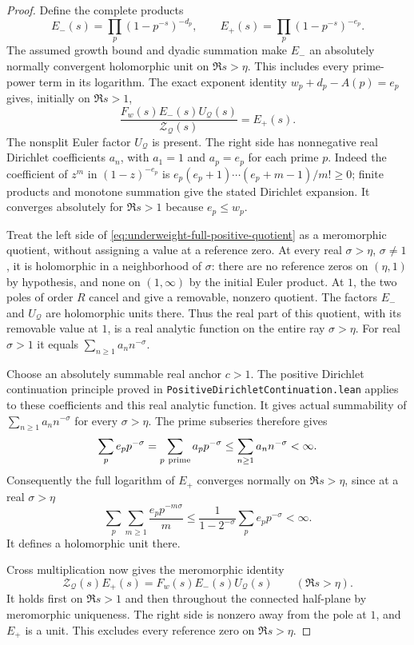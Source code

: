 \documentclass[11pt]{article}
\theoremstyle{definition}
\begin{document}
\begin{proof}
Define the complete products
\[
 E_-(s)=\prod_p(1-p^{-s})^{-d_p},\qquad
 E_+(s)=\prod_p(1-p^{-s})^{-e_p}.
\]
The assumed growth bound and dyadic summation make $E_-$
an absolutely normally convergent holomorphic unit on
$\Re s>\eta$. This includes every prime-power term in its
logarithm. The exact exponent identity
$w_p+d_p-A(p)=e_p$ gives, initially on $\Re s>1$,
\begin{equation}
 \frac{F_w(s)E_-(s)U_{\mathcal Q}(s)}
             {\mathcal Z_{\mathcal Q}(s)}
                 =E_+(s).
 \label{eq:underweight-full-positive-quotient}
\end{equation}
The nonsplit Euler factor $U_{\mathcal Q}$ is present.
The right side has nonnegative real Dirichlet coefficients
$a_n$, with $a_1=1$ and $a_p=e_p$ for each prime $p$.
Indeed the coefficient of $z^m$ in $(1-z)^{-e_p}$ is
$e_p(e_p+1)\cdots(e_p+m-1)/m!\ge0$; finite products and
monotone summation give the stated Dirichlet expansion.
It converges absolutely for $\Re s>1$ because $e_p\le w_p$.

Treat the left side of
\eqref{eq:underweight-full-positive-quotient} as a meromorphic
quotient, without assigning a value at a reference zero.
At every real $\sigma>\eta$, $\sigma\ne1$, it is holomorphic
in a neighborhood of $\sigma$: there are no reference
zeros on $(\eta,1)$ by hypothesis, and none on $(1,\infty)$
by the initial Euler product. At $1$, the two poles of
order $R$ cancel and give a removable, nonzero quotient.
The factors $E_-$ and $U_{\mathcal Q}$ are holomorphic
units there. Thus the real part of this quotient, with
its removable value at $1$, is a real analytic function
on the entire ray $\sigma>\eta$.
For real $\sigma>1$ it equals
$\sum_{n\ge1}a_n n^{-\sigma}$.

Choose an absolutely summable real anchor $c>1$.
The positive Dirichlet continuation principle proved in
\texttt{PositiveDirichletContinuation.lean} applies to
these coefficients and this real analytic function.
It gives actual summability of
$\sum_{n\ge1}a_n n^{-\sigma}$ for every $\sigma>\eta$.
The prime subseries therefore gives
\[
 \sum_p e_p p^{-\sigma}
   =\sum_{p\ {\rm prime}}a_p p^{-\sigma}
   \le\sum_{n\ge1}a_n n^{-\sigma}<\infty .
\]
Consequently the full logarithm of $E_+$ converges normally
on $\Re s>\eta$, since at a real $\sigma>\eta$
\[
 \sum_p\sum_{m\ge1}\frac{e_p p^{-m\sigma}}m
       \le\frac1{1-2^{-\sigma}}\sum_p e_p p^{-\sigma}<\infty.
\]
It defines a holomorphic unit there.

Cross multiplication now gives the meromorphic identity
\begin{equation}
 \mathcal Z_{\mathcal Q}(s)E_+(s)
           =F_w(s)E_-(s)U_{\mathcal Q}(s)
                         \qquad(\Re s>\eta).
 \label{eq:underweight-complete-cross-identity}
\end{equation}
It holds first on $\Re s>1$ and then throughout the connected
half-plane by meromorphic uniqueness. The right side is
nonzero away from the pole at $1$, and $E_+$ is a unit.
This excludes every reference zero on $\Re s>\eta$.


\end{proof}
\end{document}
